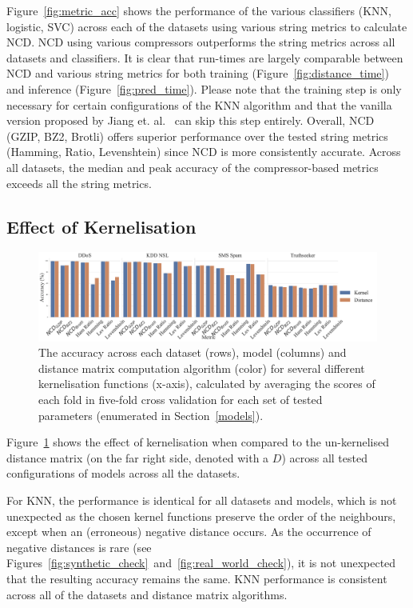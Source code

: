 \documentclass[preprint,12pt]{elsarticle}
\begin{document}
Figure~\ref{fig:metric_acc} shows the performance of the various classifiers (KNN, logistic, SVC) across each of the datasets using various string metrics to calculate NCD.
NCD using various compressors outperforms the string metrics across all datasets and classifiers.
It is clear that run-times are largely comparable between NCD and various string metrics for both training (Figure~\ref{fig:distance_time}) and inference (Figure~\ref{fig:pred_time}).
Please note that the training step is only necessary for certain configurations of the KNN algorithm and that the vanilla version proposed by Jiang et. al.~\cite{jiang2022less} can skip this step entirely.
Overall, NCD (GZIP, BZ2, Brotli) offers superior performance over the tested string metrics (Hamming, Ratio, Levenshtein) since NCD is more consistently accurate. Across all datasets, the median and peak accuracy of the compressor-based metrics exceeds all the string metrics.



\subsection{Effect of Kernelisation}

\begin{figure}
    \centering
    \includegraphics[width=\textwidth]{images/accuracy_vs_kernel.pdf}
    \caption{The accuracy across each dataset (rows), model (columns) and distance matrix computation algorithm (color) for several different kernelisation functions (x-axis), calculated by averaging the scores of each fold in five-fold cross validation for each set of tested parameters (enumerated in Section~\ref{models}).}
    \label{fig:kernel_acc}
\end{figure}

Figure~\ref{fig:kernel_acc} shows the effect of kernelisation when compared to the un-kernelised distance matrix (on the far right side, denoted with a $D$) across all tested configurations of models across all the datasets.

For KNN, the performance is identical for all datasets and models, which is not unexpected as the chosen kernel functions preserve the order of the neighbours, except when an (erroneous) negative distance occurs.
As the occurrence of negative distances is rare (see Figures~\ref{fig:synthetic_check}~and~\ref{fig:real_world_check}), it is not unexpected that the resulting accuracy remains the same.
KNN performance is consistent across all of the datasets and distance matrix algorithms.
\end{document}
